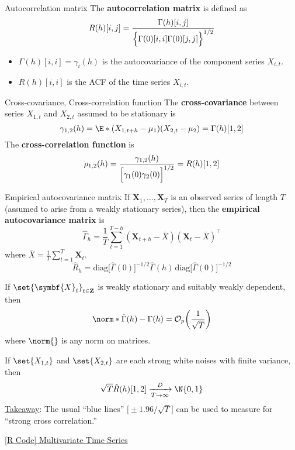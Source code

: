 \begin{Definition}{Autocorrelation matrix}{}
    The \textbf{autocorrelation matrix} is defined as
    \[ R(h)[i,j]=\frac{\Gamma(h)[i,j]}{\Bigl\{\Gamma(0)[i,i]\Gamma(0)[j,j]\Bigr\}^{1/2}}  \]
\end{Definition}
\begin{Remark}{}{}
    \begin{itemize}
        \item $ \Gamma(h)[i,i]=\gamma_i(h) $ is the autocovariance of the component
              series $ X_{i,t} $.
        \item $ R(h)[i,i] $ is the ACF of the time series $ X_{i,t} $.
    \end{itemize}
\end{Remark}
\begin{Definition}{Cross-covariance, Cross-correlation function}{}
    The \textbf{cross-covariance} between series $ X_{1,t} $ and $ X_{2,t} $
    assumed to be stationary is
    \[ \gamma_{1,2}(h)=\E*{(X_{1,t+h}-\mu_1)(X_{2,t}-\mu_2)}=\Gamma(h)[1,2] \]
    The \textbf{cross-correlation function} is
    \[ \rho_{1,2}(h)=\frac{\gamma_{1,2}(h)}{\Bigl[\gamma_1(0)\gamma_2(0)\Bigr]^{1/2}}=R(h)[1,2]  \]
\end{Definition}
\begin{Definition}{Empirical autocovariance matrix}{}
    If $ \symbf{X}_1,\ldots,\symbf{X}_T $ is an observed series of length $ T $
    (assumed to arise from a weakly stationary series), then the
    \textbf{empirical autocovariance matrix} is
    \[ \hat{\Gamma}_h=\frac{1}{T} \sum_{t=1}^{T-h}(\symbf{X}_{t+h}-\bar{X})(\symbf{X}_t-\bar{X})^\top  \]
    where $ \bar{X}=\frac{1}{T} \sum_{t=1}^{T} \symbf{X}_t $.
    \[ \hat{R}_h=\text{diag}\bigl[\hat{\Gamma}(0)\bigr]^{-1/2}\hat{\Gamma}(h)\, \text{diag}\bigl[\hat{\Gamma}(0)\bigr]^{-1/2} \]
\end{Definition}
\begin{Theorem}{}{}
    If $ \set{\symbf{X}_t}_{t\in\mathbf{Z}} $ is weakly stationary and suitably weakly dependent,
    then
    \[ \norm*{\hat{\Gamma}(h)-\Gamma(h)}=\mathcal{O}_p\biggl(\frac{1}{\sqrt{T}}\biggr) \]
    where $ \norm{} $ is any norm on matrices.

    If $ \set{X_{1,t}} $ and $ \set{X_{2,t}} $ are each strong white noises with finite variance,
    then
    \[ \sqrt{T}\hat{R}(h)[1,2]\xrightarrow[T\to\infty]{D}\N{0,1} \]
    \underline{Takeaway}: The usual ``blue lines'' $ \bigl[\pm 1.96/\sqrt{T}\bigr] $
    can be used to measure for ``strong cross correlation.''
\end{Theorem}
\href{https://github.com/Hextical/university-notes/blob/master/year-3/semester-2/STAT 443/code/11.1 - Multivariate Time Series.R}{[R Code] Multivariate Time Series}
